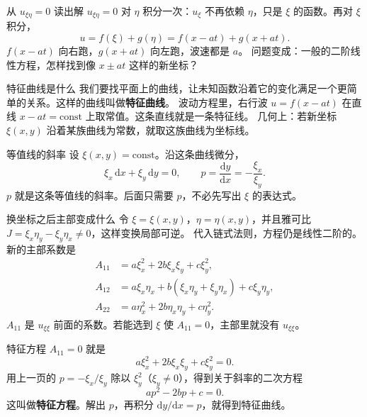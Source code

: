 \documentclass[fontset=windows, chinese, 10pt, xcolor=dvipsnames]{beamer}
\begin{document}
\begin{frame}{从 $u_{\xi\eta}=0$ 读出解}
  $u_{\xi\eta}=0$ 对 $\eta$ 积分一次：$u_\xi$ 不再依赖 $\eta$，只是 $\xi$ 的函数。再对 $\xi$ 积分，
  \begin{equation*}
    u=f(\xi)+g(\eta)=f(x-at)+g(x+at).
  \end{equation*}
  $f(x-at)$ 向右跑，$g(x+at)$ 向左跑，波速都是 $a$。
  \vspace{0.35em}
  问题变成：一般的二阶线性方程，怎样找到像 $x\pm at$ 这样的新坐标？
\end{frame}

\begin{frame}{特征曲线是什么}
  我们要找平面上的曲线，让未知函数沿着它的变化满足一个更简单的关系。这样的曲线叫做\textbf{特征曲线}。
  \vspace{0.4em}
  波动方程里，右行波 $u=f(x-at)$ 在直线 $x-at=\mathrm{const}$ 上取常值。这条直线就是一条特征线。
  \vspace{0.35em}
  几何上：若新坐标 $\xi(x,y)$ 沿着某族曲线为常数，就取这族曲线为坐标线。
\end{frame}

\begin{frame}{等值线的斜率}
  设 $\xi(x,y)=\mathrm{const}$。沿这条曲线微分，
  \begin{equation*}
    \xi_x\,\mathrm{d}x+\xi_y\,\mathrm{d}y=0,
    \qquad
    p=\frac{\mathrm{d}y}{\mathrm{d}x}=-\frac{\xi_x}{\xi_y}.
  \end{equation*}
  $p$ 就是这条等值线的斜率。后面只需要 $p$，不必先写出 $\xi$ 的表达式。
\end{frame}

\begin{frame}{换坐标之后主部变成什么}
  令 $\xi=\xi(x,y)$，$\eta=\eta(x,y)$，并且雅可比
  $J=\xi_x\eta_y-\xi_y\eta_x\neq 0$，这样变换局部可逆。
  \vspace{0.3em}
  代入链式法则，方程仍是线性二阶的。新的主部系数是
  \begin{align*}
    A_{11}&=a\xi_x^2+2b\xi_x\xi_y+c\xi_y^2,\\
    A_{12}&=a\xi_x\eta_x+b(\xi_x\eta_y+\xi_y\eta_x)+c\xi_y\eta_y,\\
    A_{22}&=a\eta_x^2+2b\eta_x\eta_y+c\eta_y^2.
  \end{align*}
  $A_{11}$ 是 $u_{\xi\xi}$ 前面的系数。若能选到 $\xi$ 使 $A_{11}=0$，主部里就没有 $u_{\xi\xi}$。
\end{frame}

\begin{frame}{特征方程}
  $A_{11}=0$ 就是
  \begin{equation*}
    a\xi_x^2+2b\xi_x\xi_y+c\xi_y^2=0.
  \end{equation*}
  用上一页的 $p=-\xi_x/\xi_y$ 除以 $\xi_y^2$（$\xi_y\neq 0$），得到关于斜率的二次方程
  \begin{equation*}
    \boxed{a p^2-2b p+c=0.}
  \end{equation*}
  这叫做\textbf{特征方程}。解出 $p$，再积分 $\mathrm{d}y/\mathrm{d}x=p$，就得到特征曲线。
\end{frame}
\end{document}
